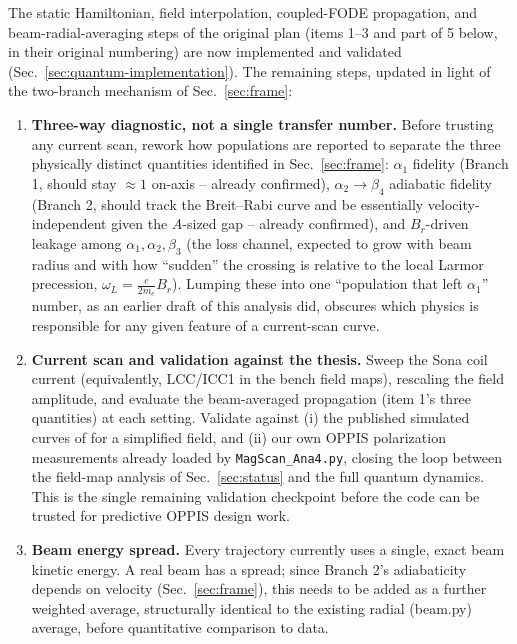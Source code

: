 \documentclass[11pt,a4paper]{article}
\begin{document}
The static Hamiltonian, field interpolation, coupled-FODE propagation, and
beam-radial-averaging steps of the original plan (items 1--3 and part of 5
below, in their original numbering) are now implemented and validated
(Sec.~\ref{sec:quantum-implementation}). The remaining steps, updated in
light of the two-branch mechanism of Sec.~\ref{sec:frame}:

\begin{enumerate}[label=\textbf{(\arabic*)}]

    \item \textbf{Three-way diagnostic, not a single transfer number.}
    Before trusting any current scan, rework how populations are reported
    to separate the three physically distinct quantities identified in
    Sec.~\ref{sec:frame}: $\alpha_1$ fidelity (Branch 1, should stay
    $\approx1$ on-axis -- already confirmed), $\alpha_2\to\beta_4$ adiabatic
    fidelity (Branch 2, should track the Breit--Rabi curve and be
    essentially velocity-independent given the $A$-sized gap -- already
    confirmed), and $B_r$-driven leakage among $\alpha_1,\alpha_2,\beta_3$
    (the loss channel, expected to grow with beam radius and with how
    ``sudden'' the crossing is relative to the local Larmor precession,
    $\omega_L=\frac{e}{2m_e}B_r$). Lumping these into one ``population that
    left $\alpha_1$'' number, as an earlier draft of this analysis did,
    obscures which physics is responsible for any given feature of a
    current-scan curve.

    \item \textbf{Current scan and validation against the thesis.}
    Sweep the Sona coil current (equivalently, LCC/ICC1 in the bench field
    maps), rescaling the field amplitude, and evaluate the beam-averaged
    propagation (item 1's three quantities) at each setting. Validate
    against (i) the published simulated curves of \cite{kannis2023} for a
    simplified field, and (ii) our own OPPIS polarization measurements
    already loaded by \texttt{MagScan\_Ana4.py}, closing the loop between
    the field-map analysis of Sec.~\ref{sec:status} and the full quantum
    dynamics. This is the single remaining validation checkpoint before the
    code can be trusted for predictive OPPIS design work.

    \item \textbf{Beam energy spread.} Every trajectory currently uses a
    single, exact beam kinetic energy. A real beam has a spread; since
    Branch 2's adiabaticity depends on velocity (Sec.~\ref{sec:frame}),
    this needs to be added as a further weighted average, structurally
    identical to the existing radial (beam.py) average, before quantitative
    comparison to data.


\end{enumerate}
\end{document}
